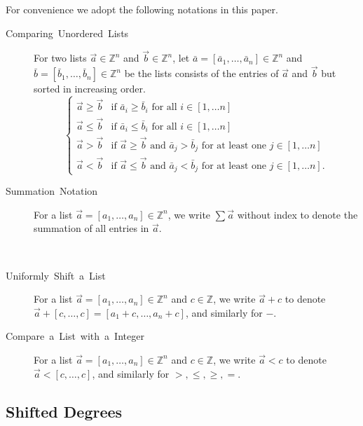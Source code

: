 For convenience we adopt the following notations in this paper. 
\begin{description}
\item [{Comparing~Unordered~Lists}] For two lists $\vec{a}\in\mathbb{Z}^{n}$
and $\vec{b}\in\mathbb{Z}^{n}$, let $\bar{a}=\left[\bar{a}_{1},\dots,\bar{a}_{n}\right]\in\mathbb{Z}^{n}$
and $\bar{b}=\left[\bar{b}_{1},\dots,\bar{b}_{n}\right]\in\mathbb{Z}^{n}$
be the lists consists of the entries of $\vec{a}$ and $\vec{b}$
but sorted in increasing order. 
\[
\begin{cases}
\vec{a}\ge\vec{b} & \mbox{if }\bar{a}_{i}\ge\bar{b}_{i}\mbox{ for all }i\in\left[1,\dots n\right]\\
\vec{a}\le\vec{b} & \mbox{if }\bar{a}_{i}\le\bar{b}_{i}\mbox{ for all }i\in\left[1,\dots n\right]\\
\vec{a}>\vec{b} & \mbox{if }\vec{a}\ge\vec{b}\mbox{ and }\bar{a}_{j}>\bar{b}_{j}\mbox{ for at least one }j\in\left[1,\dots n\right]\\
\vec{a}<\vec{b} & \mbox{if }\vec{a}\le\vec{b}\mbox{ and }\bar{a}_{j}<\bar{b}_{j}\mbox{ for at least one }j\in\left[1,\dots n\right].
\end{cases}
\]

\item [{Summation~Notation}] For a list $\vec{a}=\left[a_{1},\dots,a_{n}\right]\in\mathbb{Z}^{n}$,
we write $\sum\vec{a}$ without index to denote the summation of all
entries in $\vec{a}$. 
\item [{}]~
\item [{Uniformly~Shift~a~List}] For a list $\vec{a}=\left[a_{1},\dots,a_{n}\right]\in\mathbb{Z}^{n}$
and $c\in\mathbb{Z}$, we write $\vec{a}+c$ to denote $\vec{a}+\left[c,\dots,c\right]=\left[a_{1}+c,\dots,a_{n}+c\right]$,
and similarly for $-$.
\item [{Compare~a~List~with~a~Integer}] For a list $\vec{a}=\left[a_{1},\dots,a_{n}\right]\in\mathbb{Z}^{n}$
and $c\in\mathbb{Z}$, we write $\vec{a}<c$ to denote $\vec{a}<\left[c,\dots,c\right]$,
and similarly for $>,\le,\ge,=$.
\end{description}

\subsection{Shifted Degrees}

